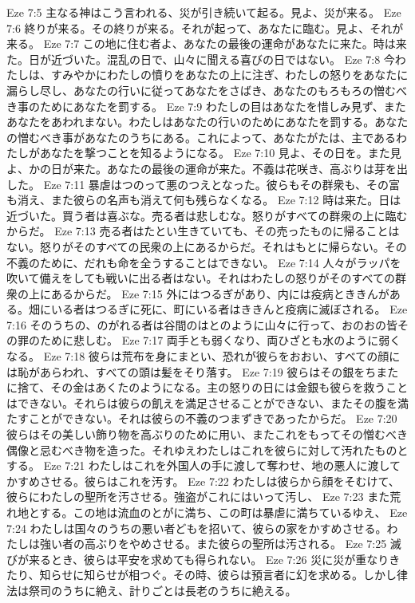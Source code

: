 Eze 7:5  主なる神はこう言われる、災が引き続いて起る。見よ、災が来る。
Eze 7:6  終りが来る。その終りが来る。それが起って、あなたに臨む。見よ、それが来る。
Eze 7:7  この地に住む者よ、あなたの最後の運命があなたに来た。時は来た。日が近づいた。混乱の日で、山々に聞える喜びの日ではない。
Eze 7:8  今わたしは、すみやかにわたしの憤りをあなたの上に注ぎ、わたしの怒りをあなたに漏らし尽し、あなたの行いに従ってあなたをさばき、あなたのもろもろの憎むべき事のためにあなたを罰する。
Eze 7:9  わたしの目はあなたを惜しみ見ず、またあなたをあわれまない。わたしはあなたの行いのためにあなたを罰する。あなたの憎むべき事があなたのうちにある。これによって、あなたがたは、主であるわたしがあなたを撃つことを知るようになる。
Eze 7:10  見よ、その日を。また見よ、かの日が来た。あなたの最後の運命が来た。不義は花咲き、高ぶりは芽を出した。
Eze 7:11  暴虐はつのって悪のつえとなった。彼らもその群衆も、その富も消え、また彼らの名声も消えて何も残らなくなる。
Eze 7:12  時は来た。日は近づいた。買う者は喜ぶな。売る者は悲しむな。怒りがすべての群衆の上に臨むからだ。
Eze 7:13  売る者はたとい生きていても、その売ったものに帰ることはない。怒りがそのすべての民衆の上にあるからだ。それはもとに帰らない。その不義のために、だれも命を全うすることはできない。
Eze 7:14  人々がラッパを吹いて備えをしても戦いに出る者はない。それはわたしの怒りがそのすべての群衆の上にあるからだ。
Eze 7:15  外にはつるぎがあり、内には疫病とききんがある。畑にいる者はつるぎに死に、町にいる者はききんと疫病に滅ぼされる。
Eze 7:16  そのうちの、のがれる者は谷間のはとのように山々に行って、おのおの皆その罪のために悲しむ。
Eze 7:17  両手とも弱くなり、両ひざとも水のように弱くなる。
Eze 7:18  彼らは荒布を身にまとい、恐れが彼らをおおい、すべての顔には恥があらわれ、すべての頭は髪をそり落す。
Eze 7:19  彼らはその銀をちまたに捨て、その金はあくたのようになる。主の怒りの日には金銀も彼らを救うことはできない。それらは彼らの飢えを満足させることができない、またその腹を満たすことができない。それは彼らの不義のつまずきであったからだ。
Eze 7:20  彼らはその美しい飾り物を高ぶりのために用い、またこれをもってその憎むべき偶像と忌むべき物を造った。それゆえわたしはこれを彼らに対して汚れたものとする。
Eze 7:21  わたしはこれを外国人の手に渡して奪わせ、地の悪人に渡してかすめさせる。彼らはこれを汚す。
Eze 7:22  わたしは彼らから顔をそむけて、彼らにわたしの聖所を汚させる。強盗がこれにはいって汚し、
Eze 7:23  また荒れ地とする。この地は流血のとがに満ち、この町は暴虐に満ちているゆえ、
Eze 7:24  わたしは国々のうちの悪い者どもを招いて、彼らの家をかすめさせる。わたしは強い者の高ぶりをやめさせる。また彼らの聖所は汚される。
Eze 7:25  滅びが来るとき、彼らは平安を求めても得られない。
Eze 7:26  災に災が重なりきたり、知らせに知らせが相つぐ。その時、彼らは預言者に幻を求める。しかし律法は祭司のうちに絶え、計りごとは長老のうちに絶える。
